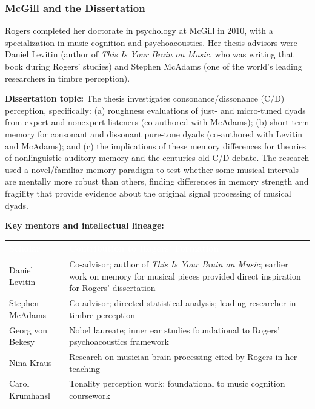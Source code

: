 \documentclass[11pt,letterpaper]{article}
\newcommand{\tableheader}[1]{\textbf{\sffamily\textcolor{white}{#1}}}
\begin{document}
\subsubsection{McGill and the Dissertation}

Rogers completed her doctorate in psychology at McGill in 2010, with a specialization in music cognition and psychoacoustics. Her thesis advisors were Daniel Levitin (author of \textit{This Is Your Brain on Music}, who was writing that book during Rogers' studies) and Stephen McAdams (one of the world's leading researchers in timbre perception).

\textbf{Dissertation topic:} The thesis investigates consonance/dissonance (C/D) perception, specifically: (a) roughness evaluations of just- and micro-tuned dyads from expert and nonexpert listeners (co-authored with McAdams); (b) short-term memory for consonant and dissonant pure-tone dyads (co-authored with Levitin and McAdams); and (c) the implications of these memory differences for theories of nonlinguistic auditory memory and the centuries-old C/D debate. The research used a novel/familiar memory paradigm to test whether some musical intervals are mentally more robust than others, finding differences in memory strength and fragility that provide evidence about the original signal processing of musical dyads.

\textbf{Key mentors and intellectual lineage:}

\begin{center}
\begin{tabularx}{\textwidth}{L{3.5cm}X}
\toprule
{}
\tableheader{Scholar} & \tableheader{Contribution to Rogers' Formation} \\
\midrule
Daniel Levitin & Co-advisor; author of \textit{This Is Your Brain on Music}; earlier work on memory for musical pieces provided direct inspiration for Rogers' dissertation \\
Stephen McAdams & Co-advisor; directed statistical analysis; leading researcher in timbre perception \\
Georg von Bekesy & Nobel laureate; inner ear studies foundational to Rogers' psychoacoustics framework \\
Nina Kraus & Research on musician brain processing cited by Rogers in her teaching \\
Carol Krumhansl & Tonality perception work; foundational to music cognition coursework \\
\bottomrule
\end{tabularx}
\end{center}
\end{document}
